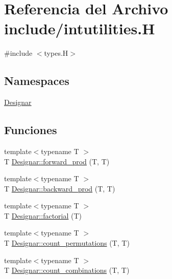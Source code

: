 \hypertarget{intutilities_8_h}{}\section{Referencia del Archivo include/intutilities.H}
\label{intutilities_8_h}
{\ttfamily \#include $<$types.\+H$>$}\newline
\subsection*{Namespaces}
\begin{DoxyCompactItemize}
\item 
 \hyperlink{namespace_designar}{Designar}
\end{DoxyCompactItemize}
\subsection*{Funciones}
\begin{DoxyCompactItemize}
\item 
{\footnotesize template$<$typename T $>$ }\\T \hyperlink{namespace_designar_a38bdfe24d16d5f665e10d75834cded69}{Designar\+::forward\+\_\+prod} (T, T)
\item 
{\footnotesize template$<$typename T $>$ }\\T \hyperlink{namespace_designar_aed558aafc7789fb59b2381d0894b51cb}{Designar\+::backward\+\_\+prod} (T, T)
\item 
{\footnotesize template$<$typename T $>$ }\\T \hyperlink{namespace_designar_a7760d03bc384dbf96c672da4848b4910}{Designar\+::factorial} (T)
\item 
{\footnotesize template$<$typename T $>$ }\\T \hyperlink{namespace_designar_a9de2f2da31210c49529db21c84162576}{Designar\+::count\+\_\+permutations} (T, T)
\item 
{\footnotesize template$<$typename T $>$ }\\T \hyperlink{namespace_designar_ad5ab5ff3ec3c98286d6a9ff3a06b8d19}{Designar\+::count\+\_\+combinations} (T, T)
\end{DoxyCompactItemize}
